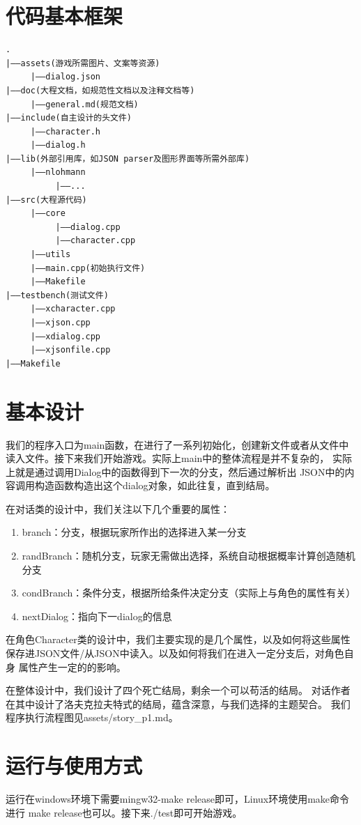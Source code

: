 \documentclass[UTF8]{ctexart}
\begin{document}
    \section{代码基本框架}
\begin{lstlisting}
.
|——assets(游戏所需图片、文案等资源)
     |——dialog.json
|——doc(大程文档，如规范性文档以及注释文档等)
     |——general.md(规范文档)
|——include(自主设计的头文件)
     |——character.h
     |——dialog.h
|——lib(外部引用库，如JSON parser及图形界面等所需外部库)
     |——nlohmann
          |——...
|——src(大程源代码)
     |——core
          |——dialog.cpp
          |——character.cpp
     |——utils
     |——main.cpp(初始执行文件)
     |——Makefile
|——testbench(测试文件)
     |——xcharacter.cpp
     |——xjson.cpp
     |——xdialog.cpp
     |——xjsonfile.cpp
|——Makefile
\end{lstlisting}
    
    \section{基本设计}
    我们的程序入口为main函数，在进行了一系列初始化，创建新文件或者从文件中
    读入文件。接下来我们开始游戏。实际上main中的整体流程是并不复杂的，
    实际上就是通过调用Dialog中的函数得到下一次的分支，然后通过解析出
    JSON中的内容调用构造函数构造出这个dialog对象，如此往复，直到结局。

    在对话类的设计中，我们关注以下几个重要的属性：
    \begin{enumerate}
        \item branch：分支，根据玩家所作出的选择进入某一分支
        \item randBranch：随机分支，玩家无需做出选择，系统自动根据概率计算创造随机分支
        \item condBranch：条件分支，根据所给条件决定分支（实际上与角色的属性有关）
        \item nextDialog：指向下一dialog的信息
    \end{enumerate}
    
    在角色Character类的设计中，我们主要实现的是几个属性，以及如何将这些属性
    保存进JSON文件/从JSON中读入。以及如何将我们在进入一定分支后，对角色自身
    属性产生一定的的影响。

    在整体设计中，我们设计了四个死亡结局，剩余一个可以苟活的结局。
    对话作者在其中设计了洛夫克拉夫特式的结局，蕴含深意，与我们选择的主题契合。
    我们程序执行流程图见assets/story_p1.md。

    \section{运行与使用方式}
    运行在windows环境下需要mingw32-make release即可，Linux环境使用make命令进行
    make release也可以。接下来./test即可开始游戏。
\end{document}
